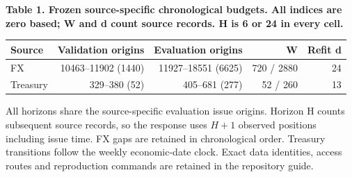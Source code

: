 \documentclass[10pt,a4paper]{article}
\begin{document}
\begin{center}
\begin{minipage}{\linewidth}
\small\textbf{Table 1. Frozen source-specific chronological budgets. All indices are zero based; W and d count source records. H is 6 or 24 in every cell.}\par\medskip
\centering\fontsize{8}{10}\selectfont
\begin{tabular}{lrrrr}
\toprule
Source & Validation origins & Evaluation origins & W & Refit d \\
\midrule
FX & 10463--11902 (1440) & 11927--18551 (6625) & 720 / 2880 & 24 \\
Treasury & 329--380 (52) & 405--681 (277) & 52 / 260 & 13 \\
\bottomrule
\end{tabular}
\end{minipage}
\end{center}
All horizons share the source-specific evaluation issue origins. Horizon H counts subsequent source records, so the response uses \(H+1\) observed positions including issue time. FX gaps are retained in chronological order. Treasury transitions follow the weekly economic-date clock. Exact data identities, access routes and reproduction commands are retained in the repository guide.
\end{document}

